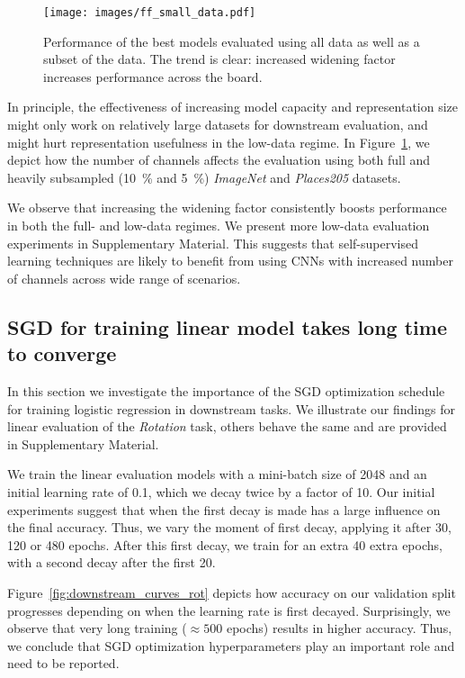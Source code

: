 \documentclass[10pt,twocolumn,letterpaper]{article}
\newcommand{\PAR}[1]{\vskip4pt \noindent {\bf #1~}}
\begin{document}
\begin{figure}[t]
  \begin{center}
    \texttt{[image: images/ff\_small\_data.pdf]}
  \end{center}
  \caption{
     Performance of the best models evaluated using all data as well as a subset of the data.
     The trend is clear: increased widening factor increases performance across the board.
  }\label{fig:ff_small_data}
\end{figure}

\PAR{Low-data regime.}
In principle, the effectiveness of increasing model capacity and representation size might only work on relatively large datasets for downstream evaluation, and might hurt representation usefulness in the low-data regime.
In Figure~\ref{fig:ff_small_data}, we depict how the number of channels affects the evaluation using both full and heavily subsampled (\SI{10}{\percent} and \SI{5}{\percent}) \emph{ImageNet} and \emph{Places205} datasets.


We observe that increasing the widening factor consistently boosts performance in both the full- and low-data regimes.
We present more low-data evaluation experiments in Supplementary Material.
This suggests that self-supervised learning techniques are likely to benefit from using CNNs with increased number of channels across wide range of scenarios.


\subsection{SGD for training linear model takes long time to converge}\label{sec:sgd-long}

In this section we investigate the importance of the SGD optimization schedule for training logistic regression in downstream tasks.
We illustrate our findings for linear evaluation of the \emph{Rotation} task, others behave the same and are provided in Supplementary Material.

We train the linear evaluation models with a mini-batch size of 2048 and an initial learning rate of 0.1, which we decay twice by a factor of 10.
Our initial experiments suggest that when the first decay is made has a large influence on the final accuracy.
Thus, we vary the moment of first decay, applying it after 30, 120 or 480 epochs.
After this first decay, we train for an extra 40 extra epochs, with a second decay after the first 20.

Figure~\ref{fig:downstream_curves_rot} depicts how accuracy on our validation split progresses depending on when the learning rate is first decayed.
Surprisingly, we observe that very long training ($\approx 500$ epochs) results in higher accuracy.
Thus, we conclude that SGD optimization hyperparameters play an important role and need to be reported.
\end{document}
